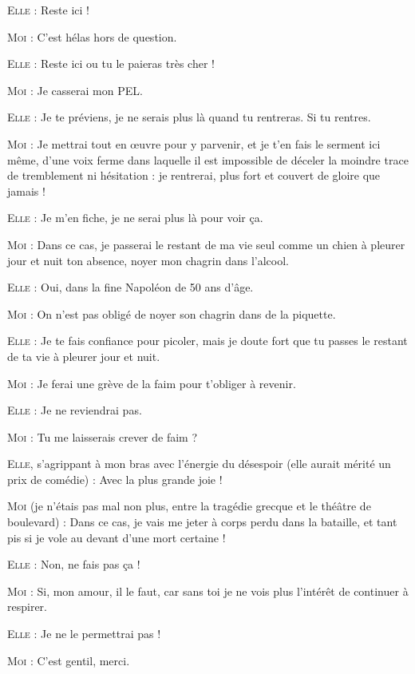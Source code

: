 \begin{dialogue}

\textsc{Elle} : Reste ici !

\textsc{Moi} : C’est hélas hors de question.

\textsc{Elle} : Reste ici ou tu le paieras très cher !

\textsc{Moi} : Je casserai mon PEL.

\textsc{Elle} : Je te préviens, je ne serais plus là quand tu rentreras. Si tu rentres.

\textsc{Moi} : Je mettrai tout en œuvre pour y parvenir, et je t’en fais le serment ici même, d’une voix ferme dans laquelle il est impossible de déceler la moindre trace de tremblement ni hésitation : je rentrerai, plus fort et couvert de gloire que jamais !

\textsc{Elle} : Je m’en fiche, je ne serai plus là pour voir ça.

\textsc{Moi} : Dans ce cas, je passerai le restant de ma vie seul comme un chien à pleurer jour et nuit ton absence, noyer mon chagrin dans l’alcool.

\textsc{Elle} : Oui, dans la fine Napoléon de 50 ans d’âge.

\textsc{Moi} : On n’est pas obligé de noyer son chagrin dans de la piquette.

\textsc{Elle} : Je te fais confiance pour picoler, mais je doute fort que tu passes le restant de ta vie à pleurer jour et nuit.

\textsc{Moi} : Je ferai une grève de la faim pour t’obliger à revenir.

\textsc{Elle} : Je ne reviendrai pas.

\textsc{Moi} : Tu me laisserais crever de faim ?

\textsc{Elle}, s’agrippant à mon bras avec l’énergie du désespoir (elle aurait mérité un prix de comédie) : Avec la plus grande joie !

\textsc{Moi} (je n’étais pas mal non plus, entre la tragédie grecque et le théâtre de boulevard) : Dans ce cas, je vais me jeter à corps perdu dans la bataille, et tant pis si je vole au devant d’une mort certaine !

\textsc{Elle} : Non, ne fais pas ça !

\textsc{Moi} : Si, mon amour, il le faut, car sans toi je ne vois plus l’intérêt de continuer à respirer.

\textsc{Elle} : Je ne le permettrai pas !

\textsc{Moi} : C’est gentil, merci.


\end{dialogue}
